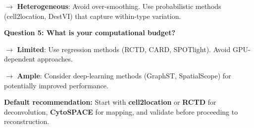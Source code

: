\begin{tcolorbox}[title=Box 2: Decision tree for method selection]
\hspace{1em} $\rightarrow$ \textbf{Heterogeneous}: Avoid over-smoothing. Use probabilistic methods (cell2location, DestVI) that capture within-type variation.

\vspace{0.5em}

\textbf{Question 5: What is your computational budget?}

\hspace{1em} $\rightarrow$ \textbf{Limited}: Use regression methods (RCTD, CARD, SPOTlight). Avoid GPU-dependent approaches.

\hspace{1em} $\rightarrow$ \textbf{Ample}: Consider deep-learning methods (GraphST, SpatialScope) for potentially improved performance.

\vspace{0.5em}

\textbf{Default recommendation:} Start with \textbf{cell2location} or \textbf{RCTD} for deconvolution, \textbf{CytoSPACE} for mapping, and validate before proceeding to reconstruction.

\end{tcolorbox}
